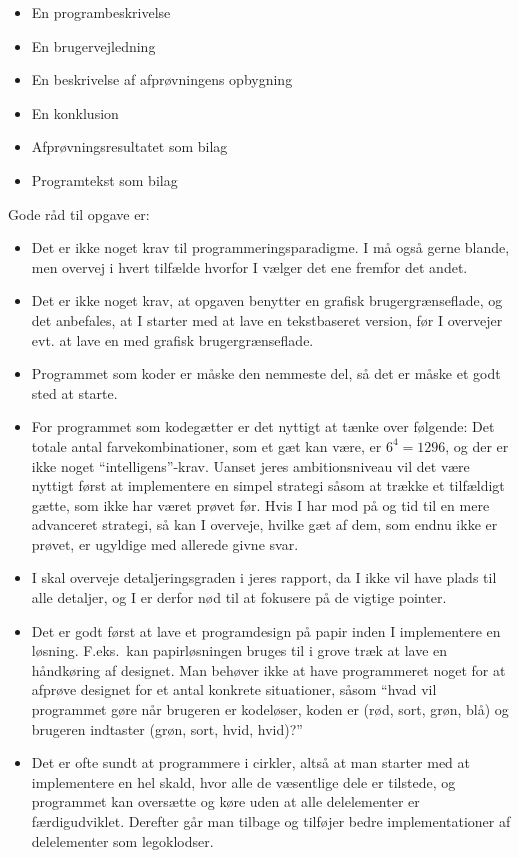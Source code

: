 \documentclass[a4paper,12pt]{article}
\begin{document}
\begin{enumerate}[label=8g.\arabic*,start=0]
\begin{itemize}
\begin{itemize}
    \item En programbeskrivelse
    \item En brugervejledning
    \item En beskrivelse af afprøvningens opbygning
    \item En konklusion
    \item Afprøvningsresultatet som bilag
    \item Programtekst som bilag
    \end{itemize}
  \end{itemize}
  Gode råd til opgave er:
  \begin{itemize}
  \item Det er ikke noget krav til programmeringsparadigme. I må også gerne blande, men overvej i hvert tilfælde hvorfor I vælger det ene fremfor det andet.
  \item Det er ikke noget krav, at opgaven benytter en grafisk brugergrænseflade, og det anbefales, at I starter med at lave en tekstbaseret version, før I overvejer evt. at lave en med grafisk brugergrænseflade.
  \item Programmet som koder er måske den nemmeste del, så det er måske et godt sted at starte.
  \item For programmet som kodegætter er det nyttigt at tænke over følgende: Det totale antal farvekombinationer, som et gæt kan være, er $6^4=1296$, og der er ikke noget ``intelligens''-krav. Uanset jeres ambitionsniveau vil det være nyttigt først at implementere en simpel strategi såsom at trække et tilfældigt gætte, som ikke har været prøvet før. Hvis I har mod på og tid til en mere advanceret strategi, så kan I overveje, hvilke gæt af dem, som endnu ikke er prøvet, er ugyldige med allerede givne svar.
  \item I skal overveje detaljeringsgraden i jeres rapport, da I ikke vil have plads til alle detaljer, og I er derfor nød til at fokusere på de vigtige pointer.
  \item Det er godt først at lave et programdesign på papir inden I implementere en løsning. F.eks.\ kan papirløsningen bruges til i grove træk at lave en håndkøring af designet. Man behøver ikke at have programmeret noget for at afprøve designet for et antal konkrete situationer, såsom ``hvad vil programmet gøre når brugeren er kodeløser, koden er (rød, sort, grøn, blå) og brugeren indtaster (grøn, sort, hvid, hvid)?''
  \item Det er ofte sundt at programmere i cirkler, altså at man starter med at implementere en hel skald, hvor alle de væsentlige dele er tilstede, og programmet kan oversætte og køre uden at alle delelementer er færdigudviklet. Derefter går man tilbage og tilføjer bedre implementationer af delelementer som legoklodser.

\end{itemize}
\end{enumerate}
\end{document}
